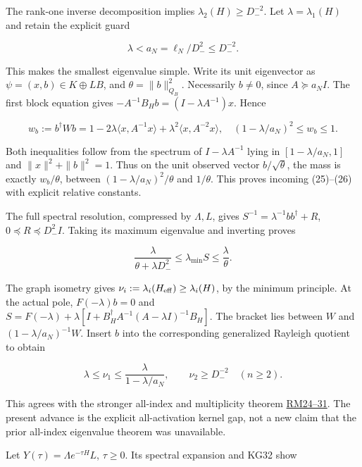 \documentclass[11pt]{article}
\begin{document}
The rank-one inverse decomposition implies \(\lambda_2(H)\ge D_-^{-2}\). Let \(\lambda=\lambda_1(H)\) and retain the explicit guard

\[
\lambda<a_N=\ell_N/D_-^2\le D_-^{-2}.
\tag{KG31}
\]

This makes the smallest eigenvalue simple. Write its unit eigenvector as \(\psi=(x,b)\in K\oplus LB\), and \(\theta=\|b\|_{Q_B}^2\). Necessarily \(b\ne0\), since \(A\succeq a_NI\). The first block equation gives \(-A^{-1}B_Hb=(I-\lambda A^{-1})x\). Hence

\[
\boxed{w_b:=b^\dagger Wb
=1-2\lambda\langle x,A^{-1}x\rangle+\lambda^2\langle x,A^{-2}x\rangle,
\quad(1-\lambda/a_N)^2\le w_b\le1.}
\tag{KG32}
\]

Both inequalities follow from the spectrum of \(I-\lambda A^{-1}\) lying in \([1-\lambda/a_N,1]\) and \(\|x\|^2+\|b\|^2=1\). Thus on the unit observed vector \(b/\sqrt\theta\), the mass is exactly \(w_b/\theta\), between \((1-\lambda/a_N)^2/\theta\) and \(1/\theta\). This proves incoming (25)--(26) with explicit relative constants.

The full spectral resolution, compressed by \(\Lambda,L\), gives \(S^{-1}=\lambda^{-1}bb^\dagger+R\), \(0\preceq R\preceq D_-^2I\). Taking its maximum eigenvalue and inverting proves

\[
\boxed{\frac{\lambda}{\theta+\lambda D_-^2}
\le\lambda_{\min}S\le\frac\lambda\theta.}
\tag{KG33}
\]

The graph isometry gives \(\nu_i:=\lambda_i(H_{\rm eff})\ge\lambda_i(H)\), by the minimum principle. At the actual pole, \(F(-\lambda)b=0\) and \(S=F(-\lambda)+\lambda[I+B_H^\dagger A^{-1}(A-\lambda I)^{-1}B_H]\). The bracket lies between \(W\) and \((1-\lambda/a_N)^{-1}W\). Insert \(b\) into the corresponding generalized Rayleigh quotient to obtain

\[
\boxed{\lambda\le\nu_1\le\frac{\lambda}{1-\lambda/a_N},\qquad
\nu_2\ge D_-^{-2}\quad(n\ge2).}
\tag{KG34}
\]

This agrees with the stronger all-index and multiplicity theorem \href{https://github.com/KokunoYumeto/zeta-function-research-reader/blob/d44d94aa43d0a1934455ddac008368583f43a2c1/workbenches/splitzero-tandem/continuations/20260921-canonical-memory-filters/REDUCED_MODEL_PROOFS.md}{RM24--31}. The present advance is the explicit all-activation kernel gap, not a new claim that the prior all-index eigenvalue theorem was unavailable.

Let \(Y(\tau)=\Lambda e^{-\tau H}L\), \(\tau\ge0\). Its spectral expansion and KG32 show
\end{document}
